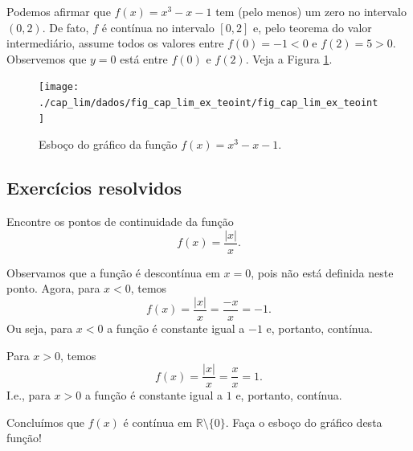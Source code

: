 \begin{ex}
  Podemos afirmar que $f(x)=x^3-x-1$ tem (pelo menos) um zero no intervalo $(0, 2)$. De fato, $f$ é contínua no intervalo $[0,2]$ e, pelo teorema do valor intermediário, assume todos os valores entre $f(0)=-1<0$ e $f(2)=5>0$. Observemos que $y = 0$ está entre $f(0)$ e $f(2)$. Veja a Figura \ref{fig:cap_lim_ex_teoint}.

  \begin{figure}[H]
    \centering
    \texttt{[image: ./cap\_lim/dados/fig\_cap\_lim\_ex\_teoint/fig\_cap\_lim\_ex\_teoint]}
    \caption{Esboço do gráfico da função $f(x) = x^3-x-1$.}
    \label{fig:cap_lim_ex_teoint}
  \end{figure}
\end{ex}

\subsection{Exercícios resolvidos}


\begin{exeresol}
  Encontre os pontos de continuidade da função
  \begin{equation}
    f(x) = \frac{|x|}{x}.
  \end{equation}
\end{exeresol}
\begin{resol}
  Observamos que a função é descontínua em $x=0$, pois não está definida neste ponto. Agora, para $x < 0$, temos
  \begin{equation}
    f(x) = \frac{|x|}{x} = \frac{-x}{x} = -1.
  \end{equation}
  Ou seja, para $x<0$ a função é constante igual a $-1$ e, portanto, contínua.

  Para $x > 0$, temos
  \begin{equation}
    f(x) = \frac{|x|}{x} = \frac{x}{x} = 1.
  \end{equation}
  I.e., para $x > 0$ a função é constante igual a $1$ e, portanto, contínua.

  Concluímos que $f(x)$ é contínua em $\mathbb{R}\setminus\{0\}$. Faça o esboço do gráfico desta função!
\end{resol}

